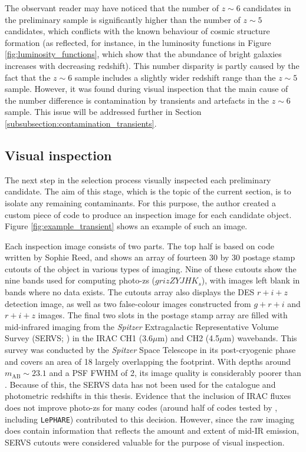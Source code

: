 The observant reader may have noticed that the number of $z\sim6$ candidates in the preliminary sample is significantly higher than the number of $z\sim5$ candidates, which conflicts with the known behaviour of cosmic structure formation (as reflected, for instance, in the luminosity functions in Figure \ref{fig:luminosity_functions}, which show that the abundance of bright galaxies increases with decreasing redshift). This number disparity is partly caused by the fact that the $z\sim6$ sample includes a slightly wider redshift range than the $z\sim5$ sample. However, it was found during visual inspection that the main cause of the number difference is contamination by transients and artefacts in the $z\sim6$ sample. This issue will be addressed further in Section \ref{subsubsection:contamination_transients}. \par



\subsection{Visual inspection}\label{subsection:visual_inspection}
The next step in the selection process visually inspected each preliminary candidate. The aim of this stage, which is the topic of the current section, is to isolate any remaining contaminants. For this purpose, the author created a custom piece of code to produce an inspection image for each candidate object. Figure \ref{fig:example_transient} shows an example of such an image. \par 

Each inspection image consists of two parts. The top half is based on code written by Sophie Reed, and shows an array of fourteen \SI{30}{\arcsec} by \SI{30}{\arcsec} postage stamp cutouts of the object in various types of imaging. Nine of these cutouts show the nine \DESVIDEO bands used for computing photo-zs ($grizZYJHK_{s}$), with images left blank in bands where no data exists. The cutouts array also displays the DES $r+i+z$ detection image, as well as two false-colour images constructed from $g+r+i$ and $r+i+z$ images. The final two slots in the postage stamp array are filled with mid-infrared imaging from the \textit{Spitzer} Extragalactic Representative Volume Survey (SERVS; \citealt{2012PASP..124..714M}) in the IRAC CH1 (3.6$\mu$m) and CH2 (4.5$\mu$m) wavebands. This survey was conducted by the \textit{\textit{Spitzer}} Space Telescope in its post-cryogenic phase and covers an area of \SI{18}{\sqdeg} largely overlapping the \DESVIDEO footprint. With depths around $m_{\mathrm{AB}}\sim 23.1$ and a PSF FWHM of \SI{2}{\arcsec}, its image quality is considerably poorer than \DESVIDEO. Because of this, the SERVS data has not been used for the catalogue and photometric redshifts in this thesis. Evidence that the inclusion of IRAC fluxes does not improve photo-zs for many codes (around half of codes tested by \citealt{2010A&A...523A..31H}, including \texttt{LePHARE}) contributed to this decision. However, since the raw imaging does contain information that reflects the amount and extent of mid-IR emission, SERVS cutouts were considered valuable for the purpose of visual inspection. \par 


